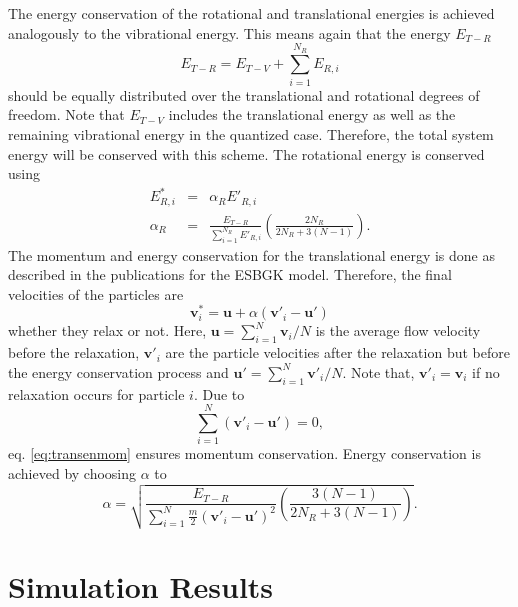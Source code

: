 \documentclass[aip,pof,amsmath,amssymb,preprint]{revtex4-1}
\begin{document}
The energy conservation of the rotational and translational energies is achieved analogously to the vibrational energy. This means again that the energy $E_{T-R}$
\begin{equation} 
E_{T-R}=E_{T-V} + \sum_{i=1}^{N_R} E_{R,i}
\end{equation}
should be equally distributed over the translational and rotational degrees of freedom.
Note that $E_{T-V}$ includes the translational energy as well as the remaining vibrational energy in the quantized case. Therefore, the total system energy will be conserved with this scheme. The rotational energy is conserved using
\begin{eqnarray}
E^*_{R,i}&=&\alpha_RE'_{R,i} \\
\alpha_R &=& \frac{E_{T-R}}{\sum_{i=1}^{N_R} E'_{R,i}}\left(\frac{2N_R}{2N_R+3(N-1)}\right).
\end{eqnarray}
The momentum and energy conservation for the translational energy is done as described in the publications 
\cite{Pfeiffer2018,gallis2011investigation} for the ESBGK model. Therefore, the final velocities of the particles are
\begin{equation}
\mathbf v_i^*=\mathbf u + \alpha(\mathbf v'_i-\mathbf u')
\label{eq:transenmom}
\end{equation}
whether they relax or not. Here, $\mathbf u=\sum_{i=1}^N \mathbf v_i/N$ is the average flow velocity before the relaxation, 
$\mathbf v'_i$ are the particle velocities after the relaxation but before the energy conservation process and $\mathbf u'=\sum_{i=1}^N \mathbf v'_i/N$. Note that, 
$\mathbf v'_i = \mathbf v_i$ if no relaxation occurs for particle $i$. Due to
\begin{equation}
\sum_{i=1}^N(\mathbf v'_i-\mathbf u')=0, 
\end{equation} 
eq. \eqref{eq:transenmom} ensures momentum conservation. Energy conservation is achieved by choosing $\alpha$ to
\begin{equation}
\alpha = \sqrt{\frac{E_{T-R}}{\sum_{i=1}^N\frac{m}{2}(\mathbf v'_i-\mathbf u')^2}
\left(\frac{3(N-1)}{2N_R+3(N-1)}\right)}.
\end{equation}

\section{Simulation Results}
\end{document}
